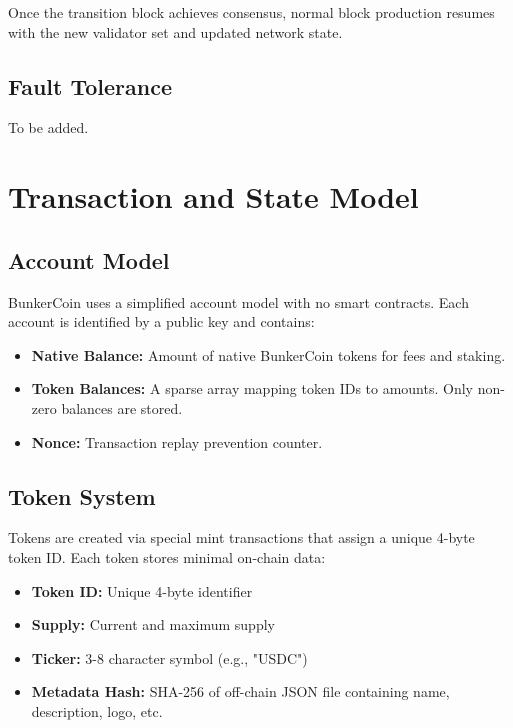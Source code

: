 \documentclass{article}
\begin{document}
Once the transition block achieves consensus, normal block production resumes with the new validator set and updated network state.

\subsection{Fault Tolerance}

To be added.

\section{Transaction and State Model}
\label{sec:transaction_state}

\subsection{Account Model}
\label{sec:account_model}

BunkerCoin uses a simplified account model with no smart contracts. Each account is identified by a public key and contains:

\begin{itemize}
    \item \textbf{Native Balance:} Amount of native BunkerCoin tokens for fees and staking.
    \item \textbf{Token Balances:} A sparse array mapping token IDs to amounts. Only non-zero balances are stored.
    \item \textbf{Nonce:} Transaction replay prevention counter.
\end{itemize}

\subsection{Token System}
\label{sec:tokens}

Tokens are created via special mint transactions that assign a unique 4-byte token ID. Each token stores minimal on-chain data:

\begin{itemize}
    \item \textbf{Token ID:} Unique 4-byte identifier
    \item \textbf{Supply:} Current and maximum supply
    \item \textbf{Ticker:} 3-8 character symbol (e.g., "USDC")
    \item \textbf{Metadata Hash:} SHA-256 of off-chain JSON file containing name, description, logo, etc.
\end{itemize}
\end{document}

